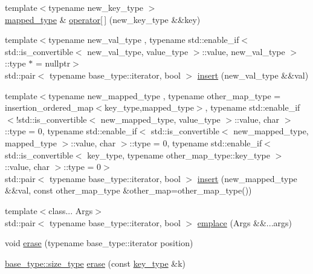 \begin{DoxyCompactItemize}
\item 
{\footnotesize template$<$typename new\+\_\+key\+\_\+type $>$ }\\\hyperlink{classIceBRG_1_1insertion__ordered__map_a4ab99f9f37138d3239735b5ff4aac2e5}{mapped\+\_\+type} \& \hyperlink{classIceBRG_1_1insertion__ordered__map_a5f5aeac415ad2b4162731f6c08488918}{operator\mbox{[}$\,$\mbox{]}} (new\+\_\+key\+\_\+type \&\&key)
\item 
{\footnotesize template$<$typename new\+\_\+val\+\_\+type , typename std\+::enable\+\_\+if$<$ std\+::is\+\_\+convertible$<$ new\+\_\+val\+\_\+type, value\+\_\+type $>$\+::value, new\+\_\+val\+\_\+type $>$\+::type $\ast$  = nullptr$>$ }\\std\+::pair$<$ typename base\+\_\+type\+::iterator, bool $>$ \hyperlink{classIceBRG_1_1insertion__ordered__map_acabf6130fcb8b1ee1053f295f15576a8}{insert} (new\+\_\+val\+\_\+type \&\&val)
\item 
{\footnotesize template$<$typename new\+\_\+mapped\+\_\+type , typename other\+\_\+map\+\_\+type  = insertion\+\_\+ordered\+\_\+map$<$key\+\_\+type,mapped\+\_\+type$>$, typename std\+::enable\+\_\+if$<$!std\+::is\+\_\+convertible$<$ new\+\_\+mapped\+\_\+type, value\+\_\+type $>$\+::value, char $>$\+::type  = 0, typename std\+::enable\+\_\+if$<$ std\+::is\+\_\+convertible$<$ new\+\_\+mapped\+\_\+type, mapped\+\_\+type $>$\+::value, char $>$\+::type  = 0, typename std\+::enable\+\_\+if$<$ std\+::is\+\_\+convertible$<$ key\+\_\+type, typename other\+\_\+map\+\_\+type\+::key\+\_\+type $>$\+::value, char $>$\+::type  = 0$>$ }\\std\+::pair$<$ typename base\+\_\+type\+::iterator, bool $>$ \hyperlink{classIceBRG_1_1insertion__ordered__map_a3cf8c0bddcdab93acedd5849c17faf18}{insert} (new\+\_\+mapped\+\_\+type \&\&val, const other\+\_\+map\+\_\+type \&other\+\_\+map=other\+\_\+map\+\_\+type())
\item 
{\footnotesize template$<$class... Args$>$ }\\std\+::pair$<$ typename base\+\_\+type\+::iterator, bool $>$ \hyperlink{classIceBRG_1_1insertion__ordered__map_aec47c4c13110aa5b8b8c54f2e93f409c}{emplace} (Args \&\&...args)
\item 
void \hyperlink{classIceBRG_1_1insertion__ordered__map_a296af7873f2c543c802bc246a0d19a7e}{erase} (typename base\+\_\+type\+::iterator position)
\item 
\hyperlink{lib_2IceBRG__main_2common_8h_a566c61f2ca17211f4ba8557f3f65e8d3}{base\+\_\+type\+::size\+\_\+type} \hyperlink{classIceBRG_1_1insertion__ordered__map_a116d6afa13598b786f3d9ded19d09af9}{erase} (const \hyperlink{classIceBRG_1_1insertion__ordered__map_a89f1c1aa5a0c6d1a681a0957092bb738}{key\+\_\+type} \&k)

\end{DoxyCompactItemize}
